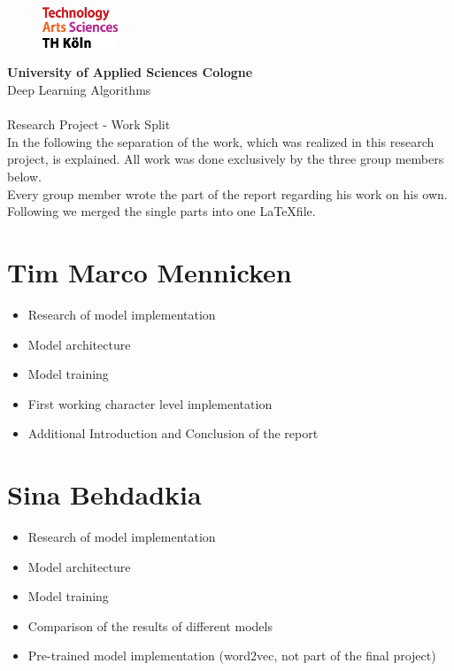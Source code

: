 \documentclass[a4paper,11pt,oneside]{article}
\begin{document}
  \pagestyle{fancy} %
  \fancyhead{}
  \fancyhf{}
  \renewcommand{\headrulewidth}{0pt}
  \renewcommand{\footrulewidth}{0.4pt}
  \fancyfoot[R] {}
  \begin{figure}
    \includegraphics[width=0.2\textwidth]{sources/logo_TH-Koeln_CMYK_22pt}
  \end{figure}
  \Large
  \textbf{University of Applied Sciences Cologne}\\
  Deep Learning Algorithms\\
  \\
  \large
  Research Project - Work Split\\

In the following the separation of the work, which was realized in this research project, is explained. All work was done exclusively by the three group members below.\\
Every group member wrote the part of the report regarding his work on his own. Following we merged the single parts into one \LaTeX file.

\section*{Tim Marco Mennicken}

\begin{itemize}
\item Research of model implementation
\item Model architecture
\item Model training
\item First working character level implementation
\item Additional Introduction and Conclusion of the report
\end{itemize}

\section*{Sina Behdadkia}

\begin{itemize}
\item Research of model implementation
\item Model architecture
\item Model training
\item Comparison of the results of different models
\item Pre-trained model implementation (word2vec, not part of the final project)
\end{itemize}
\end{document}
